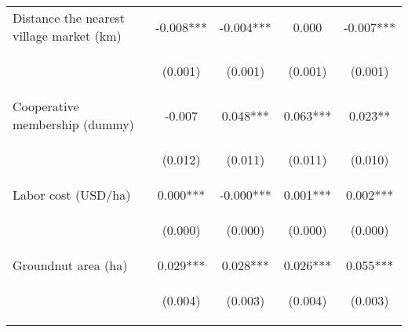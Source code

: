 \begin{center}
\begin{tabular}{lcccc}
Distance the nearest village market (km) & -0.008*** & -0.004*** & 0.000 & -0.007*** \\
\vspace{4pt} & \begin{footnotesize}(0.001)\end{footnotesize} & \begin{footnotesize}(0.001)\end{footnotesize} & \begin{footnotesize}(0.001)\end{footnotesize} & \begin{footnotesize}(0.001)\end{footnotesize} \\
Cooperative membership (dummy) & -0.007 & 0.048*** & 0.063*** & 0.023** \\
\vspace{4pt} & \begin{footnotesize}(0.012)\end{footnotesize} & \begin{footnotesize}(0.011)\end{footnotesize} & \begin{footnotesize}(0.011)\end{footnotesize} & \begin{footnotesize}(0.010)\end{footnotesize} \\
Labor cost (USD/ha) & 0.000*** & -0.000*** & 0.001*** & 0.002*** \\
\vspace{4pt} & \begin{footnotesize}(0.000)\end{footnotesize} & \begin{footnotesize}(0.000)\end{footnotesize} & \begin{footnotesize}(0.000)\end{footnotesize} & \begin{footnotesize}(0.000)\end{footnotesize} \\
Groundnut area (ha) & 0.029*** & 0.028*** & 0.026*** & 0.055*** \\
\vspace{4pt} & \begin{footnotesize}(0.004)\end{footnotesize} & \begin{footnotesize}(0.003)\end{footnotesize} & \begin{footnotesize}(0.004)\end{footnotesize} & \begin{footnotesize}(0.003)\end{footnotesize} \\

\end{tabular}
\end{center}
